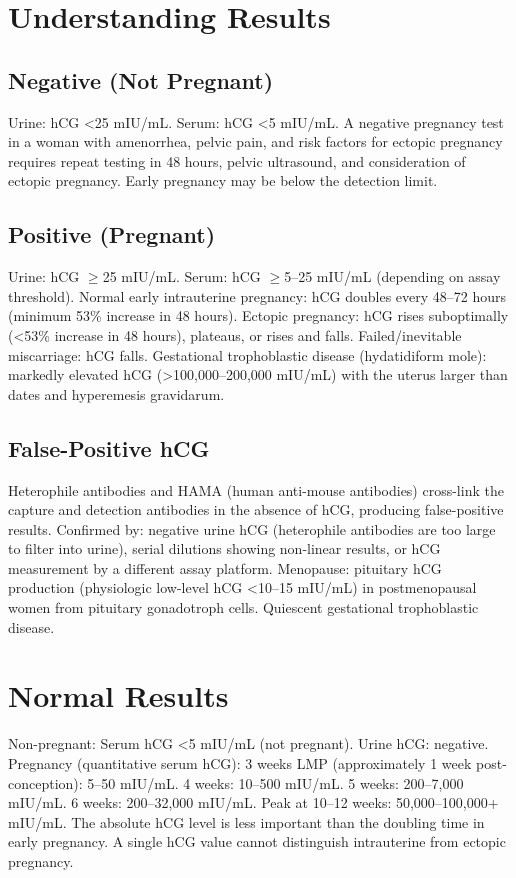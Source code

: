 \section*{Understanding Results}
\subsection*{Negative (Not Pregnant)}
Urine: hCG <25 mIU/mL. Serum: hCG <5 mIU/mL. A negative pregnancy test in a woman with amenorrhea, pelvic pain, and risk factors for ectopic pregnancy requires repeat testing in 48 hours, pelvic ultrasound, and consideration of ectopic pregnancy. Early pregnancy may be below the detection limit.
\subsection*{Positive (Pregnant)}
Urine: hCG $\geq$25 mIU/mL. Serum: hCG $\geq$5--25 mIU/mL (depending on assay threshold). Normal early intrauterine pregnancy: hCG doubles every 48--72 hours (minimum 53\% increase in 48 hours). Ectopic pregnancy: hCG rises suboptimally (<53\% increase in 48 hours), plateaus, or rises and falls. Failed/inevitable miscarriage: hCG falls. Gestational trophoblastic disease (hydatidiform mole): markedly elevated hCG (>100,000--200,000 mIU/mL) with the uterus larger than dates and hyperemesis gravidarum.
\subsection*{False-Positive hCG}
Heterophile antibodies and HAMA (human anti-mouse antibodies) cross-link the capture and detection antibodies in the absence of hCG, producing false-positive results. Confirmed by: negative urine hCG (heterophile antibodies are too large to filter into urine), serial dilutions showing non-linear results, or hCG measurement by a different assay platform. Menopause: pituitary hCG production (physiologic low-level hCG <10--15 mIU/mL) in postmenopausal women from pituitary gonadotroph cells. Quiescent gestational trophoblastic disease.
\section*{Normal Results}
Non-pregnant: Serum hCG <5 mIU/mL (not pregnant). Urine hCG: negative. Pregnancy (quantitative serum hCG): 3 weeks LMP (approximately 1 week post-conception): 5--50 mIU/mL. 4 weeks: 10--500 mIU/mL. 5 weeks: 200--7,000 mIU/mL. 6 weeks: 200--32,000 mIU/mL. Peak at 10--12 weeks: 50,000--100,000+ mIU/mL. The absolute hCG level is less important than the doubling time in early pregnancy. A single hCG value cannot distinguish intrauterine from ectopic pregnancy.
